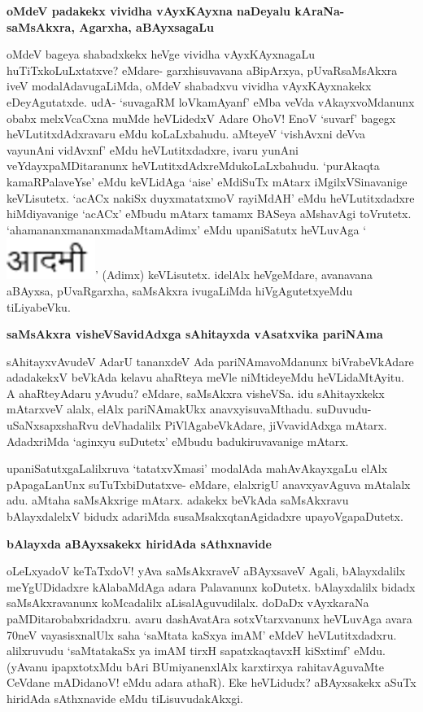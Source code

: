 {\bigskip
\noindent
{\large\bf oMdeV padakekx vividha vAyxKAyxna naDeyalu kAraNa- saMsAkxra, Agarxha, aBAyxsagaLu}}\label{page212}
\medskip

\noindent
oMdeV bageya shabadxkekx heVge vividha vAyxKAyxnagaLu huTiTxkoLuLxtatxve? eMdare- garxhisuvavana aBi\-pArxya, pUvaRsaMsAkxra iveV modalAdavugaLiMda, oMdeV shabadxvu vividha vAyxKAyxnakekx eDeyAgu\-tatxde. udA- `suvagaRM loVkamAyanf' eMba veVda vAkayxvoMdanunx obabx melxVcaCxna muMde heVLidedxV Adare OhoV! EnoV `suvarf' bagegx heVLutitxdAdxravaru eMdu koLaLxbahudu. aMteyeV `vishAvxni deVva vayu\-nAni vidAvxnf' eMdu heVLutitxdadxre, ivaru yunAni veYdayxpaMDitaranunx heVLutitxdAdxreMdukoLaLxbahudu. `purAkaqta kamaRPalaveYse' eMdu keVLidAga `aise' eMdiSuTx mAtarx iMgilxVSinavanige keVLisutetx. `acACx nakiSx duyxmatatxmoV rayiMdAH'\label{113} eMdu heVLutitxdadxre hiMdiyavanige `acACx' eMbudu mAtarx tamamx BASeya aMshavAgi toVrutetx. `ahamananxmananxmadaMtamAdimx' eMdu upaniSatutx heVLuvAga `{\includegraphics[scale=.6]{fig2.eps}}' (Adimx) keVLisutetx. idelAlx heVgeMdare, avanavana aBAyxsa, pUvaRgarxha, saMsAkxra ivugaLiMda hiVgAgutetxyeMdu tiLiyabeVku.

{\bigskip
\noindent
{\large\bf saMsAkxra visheVSavidAdxga sAhitayxda vAsatxvika pariNAma}}\label{page213}
\medskip

\noindent
sAhitayxvAvudeV AdarU tananxdeV Ada pariNAmavoMdanunx biVrabeVkAdare adadakekxV beVkAda kelavu ahaRteya meVle niMtideyeMdu heVLidaMtAyitu. A ahaRteyAdaru yAvudu? eMdare, saM\-sAkxra visheVSa. idu sAhitayxkekx mAtarxveV alalx, elAlx pariNAmakUkx anavxyisuvaMthadu. suDuvudu- uSaNxsapxshaRvu deVhadalilx PiVlAgabeVkAdare, jiVvavidAdxga mAtarx. AdadxriMda `aginxyu suDutetx' eMbudu badukiruvavanige mAtarx.

upaniSatutxgaLalilxruva `tatatxvXmasi' modalAda mahAvAkayxgaLu elAlx pApa\-gaLanUnx suTuTxbiDutatxve- eMdare, elalxrigU anavxyavAguva mAtalalx adu. \hbox{aMtaha} saMsAkxrige mAtarx. adakekx beVkAda saMsAkxravu bAlayxdalelxV bidudx adariMda susaMsakxqtanAgidadxre upayoVgapaDutetx.

{\bigskip
\noindent
{\large\bf bAlayxda aBAyxsakekx hiridAda sAthxnavide}}\label{page213}
\medskip

\noindent
oLeLxyadoV keTaTxdoV! yAva saMsAkxraveV aBAyxsaveV Agali, bAlayxdalilx meYgUDi\-dadxre kAlabaMdAga adara Palavanunx koDutetx. bAlayxdalilx bidadx saMsAkxravanunx koMcadalilx aLisalAguvudilalx. doDaDx vAyxkaraNa paMDitarobabxridadxru. avaru dashAvatAra sotxVtarxvanunx heVLuvAga avara 70neV vayasisxnalUlx saha `saM\-tata kaSxya imAM' eMdeV heVLutitxdadxru. alilxruvudu `saMtatakaSx ya imAM\label{213} tirxH sapatxkaqtavxH kiSxtimf' eMdu. (yAvanu ipapxtotxMdu bAri BUmiyanenxlAlx karxtirxya rahitavAguvaMte CeVdane mADidanoV! eMdu adara athaR). Eke heVLidudx? aBAyxsakekx aSuTx hiridAda sAthxnavide eMdu tiLisuvudakAkxgi.

